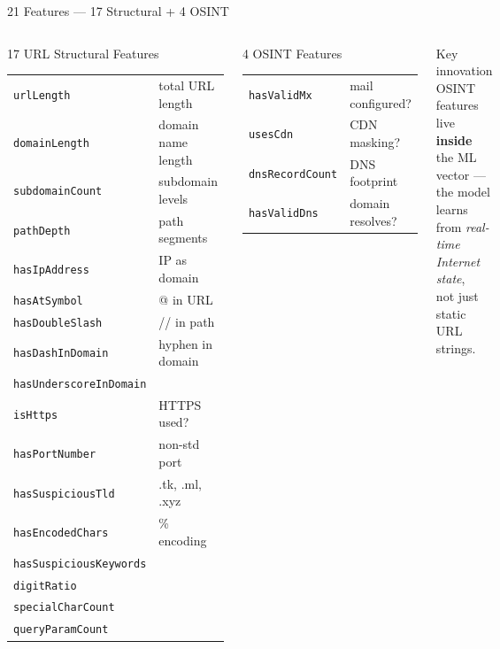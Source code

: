 \documentclass[aspectratio=169,10pt]{beamer}
\begin{document}
\begin{frame}{21 Features — 17 Structural + 4 OSINT}
  \vspace{0.2cm}
  \begin{columns}[T]
      \begin{block}{17 URL Structural Features}
        \footnotesize
        \begin{tabular}{@{}ll@{}}
          \texttt{urlLength} & total URL length \\
          \texttt{domainLength} & domain name length \\
          \texttt{subdomainCount} & subdomain levels \\
          \texttt{pathDepth} & path segments \\
          \texttt{hasIpAddress} & IP as domain \\
          \texttt{hasAtSymbol} & @ in URL \\
          \texttt{hasDoubleSlash} & // in path \\
          \texttt{hasDashInDomain} & hyphen in domain \\
          \texttt{hasUnderscoreInDomain} & \\
          \texttt{isHttps} & HTTPS used? \\
          \texttt{hasPortNumber} & non-std port \\
          \texttt{hasSuspiciousTld} & .tk, .ml, .xyz \\
          \texttt{hasEncodedChars} & \% encoding \\
          \texttt{hasSuspiciousKeywords} & \\
          \texttt{digitRatio} & \\
          \texttt{specialCharCount} & \\
          \texttt{queryParamCount} & \\
        \end{tabular}
      \end{block}
      \begin{block}{4 OSINT Features}
        \footnotesize
        \begin{tabular}{@{}ll@{}}
          \texttt{hasValidMx} & mail configured? \\
          \texttt{usesCdn} & CDN masking? \\
          \texttt{dnsRecordCount} & DNS footprint \\
          \texttt{hasValidDns} & domain resolves? \\
        \end{tabular}
      \end{block}
      \vspace{0.4cm}
      \begin{exampleblock}{Key innovation}
        \small OSINT features live \textbf{inside} the ML vector —\\the model learns from \emph{real-time Internet state},\\not just static URL strings.
      \end{exampleblock}
  \end{columns}
\end{frame}
\end{document}
